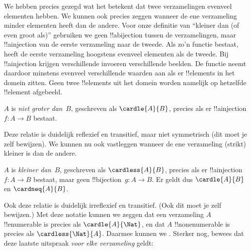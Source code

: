 \documentclass[../../../include/open-logic-section]{subfiles}
\begin{document}


\begin{explain}
We hebben precies gezegd wat het betekent dat twee verzamelingen evenveel
elementen hebben. We kunnen ook precies zeggen wanneer de ene verzameling
minder elementen heeft dan de andere. Voor onze definitie van ``kleiner dan
(of even groot als)'' gebruiken we geen !!a{bijection} tussen de
verzamelingen, maar !!a{injection} van de eerste verzameling naar de tweede.
Als zo'n functie bestaat, heeft de eerste verzameling hoogstens evenveel
elementen als de tweede. Bij !!a{injection} krijgen verschillende invoeren
verschillende beelden. De functie neemt daardoor minstens evenveel
verschillende waarden aan als er !!{element}s in het domein zitten. Geen twee
!!{element}s uit het domein worden namelijk op hetzelfde !!{element} afgebeeld.
\end{explain}

\begin{defn}
$A$ is \emph{niet groter dan}~$B$, geschreven als $\cardle{A}{B}$, precies
als er !!a{injection} $f \colon A \to B$ bestaat.
\end{defn}

Deze relatie is duidelijk reflexief en transitief, maar niet symmetrisch
(dit moet je zelf bewijzen). We kunnen nu ook vastleggen wanneer de ene
verzameling (strikt) kleiner is dan de andere. 

\begin{defn}
$A$ is \emph{kleiner dan}~$B$, geschreven als $\cardless{A}{B}$, precies als
er !!a{injection}~$f\colon A \to B$ bestaat, maar geen
!!{bijection}~$g\colon A \to B$. Er geldt dus $\cardle{A}{B}$ en
$\cardneq{A}{B}$.
\end{defn}

Ook deze relatie is duidelijk irreflexief en transitief. (Ook dit moet je
zelf bewijzen.) Met deze notatie kunnen we zeggen dat een verzameling $A$
!!{enumerable} is precies als $\cardle{A}{\Nat}$, en dat $A$
!!{nonenumerable} is precies als $\cardless{\Nat}{A}$. Daarmee kunnen we
. Sterker nog,
\citet{Cantor1892} bewees dat deze laatste uitspraak \emph{voor elke
verzameling} geldt:
\end{document}

